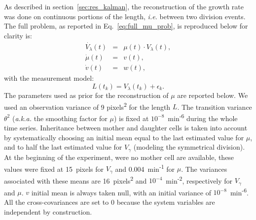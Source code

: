 As described in section~\ref{sec:res_kalman}, the reconstruction of the growth rate was done on continuous portions of the length, \textit{i.e.} between two division events.
The full problem, as reported in Eq.~\ref{eq:full_mu_prob}, is reproduced below for clarity is:
\begin{eqnarray*}
\dot{V_\lambda}(t) &=& \mu (t) \cdot V_\lambda (t),\nonumber\\
\dot{\mu}(t) &=& v(t),\\
\dot{v}(t) &=& w(t),\nonumber
\end{eqnarray*}
with the measurement model:
\begin{equation*}
L(t_k) = V_\lambda(t_k) + \epsilon_k.
\end{equation*}
The parameters used as prior for the reconstruction of $\mu$ are reported below.
We used an observation variance of 9 pixels\textsuperscript{2} for the length $L$.
The transition variance $\theta^2$ (\textit{a.k.a.} the smoothing factor for $\mu$) is fixed at $10^{-8}$~min\textsuperscript{-6} during the whole time series.
Inheritance between mother and daughter cells is taken into account by systematically choosing an initial mean equal to the last estimated value for $\mu$, and to half the last estimated value for $V_\gamma$ (modeling the symmetrical division).
At the beginning of the experiment, were no mother cell are available, these values were fixed at 15~pixels for $V_\gamma$ and 0.004~min\textsuperscript{-1} for $\mu$.
The variances associated with these means are 16~pixels\textsuperscript{2} and $10^{-4}$~min\textsuperscript{-2}, respectively for $V_\gamma$ and $\mu$.
$v$ initial mean is always taken null, with an initial variance of $10^{-8}$~min\textsuperscript{-6}.
All the cross-covariances are set to 0 because the system variables are independent by construction.

